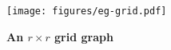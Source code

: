 \begin{figure}[h]
  \centering
  \vspace{1em}
  \texttt{[image: figures/eg-grid.pdf]}
  \vspace{1em}
  \caption{\textbf{An $r \times r$ grid graph}}\label{fig:grid_eg}
\end{figure}